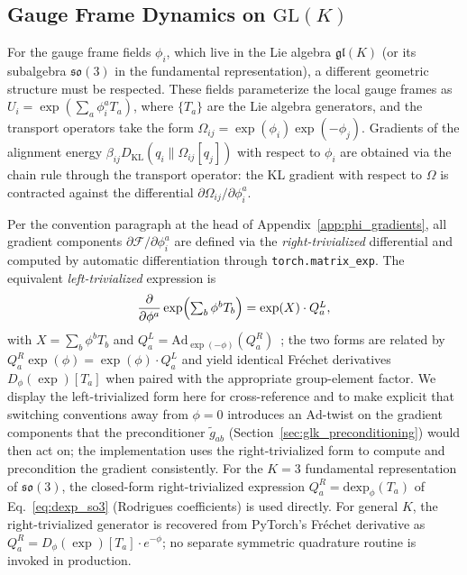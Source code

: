 \documentclass[twoside,11pt]{article}
\begin{document}
\subsection{Gauge Frame Dynamics on $\mathrm{GL}(K)$}
For the gauge frame fields $\phi_i$, which live in the Lie algebra $\mathfrak{gl}(K)$ (or its subalgebra $\mathfrak{so}(3)$ in the fundamental representation), a different geometric structure must be respected. These fields parameterize the local gauge frames as $U_i = \exp(\sum_a \phi_i^a T_a)$, where $\{T_a\}$ are the Lie algebra generators, and the transport operators take the form $\Omega_{ij} = \exp(\phi_i)\exp(-\phi_j)$. Gradients of the alignment energy $\beta_{ij} D_{\mathrm{KL}}(q_i \| \Omega_{ij}[q_j])$ with respect to $\phi_i$ are obtained via the chain rule through the transport operator: the KL gradient with respect to $\Omega$ is contracted against the differential $\partial\Omega_{ij}/\partial\phi_i^a$.

Per the convention paragraph at the head of Appendix~\ref{app:phi_gradients}, all gradient components $\partial \mathcal{F}/\partial \phi_i^a$ are defined via the \emph{right-trivialized} differential and computed by automatic differentiation through \texttt{torch.matrix\_exp}. The equivalent \emph{left-trivialized} expression is
\begin{equation}
\frac{\partial}{\partial \phi^a}\exp \Bigl(\textstyle\sum_b \phi^b T_b\Bigr) = \exp(X)\cdot Q_a^{L},
\end{equation}
with $X = \sum_b \phi^b T_b$ and $Q_a^{L} = \mathrm{Ad}_{\exp(-\phi)}(Q_a^{R})$~\citep{Hall2015}; the two forms are related by $Q_a^{R} \exp(\phi) = \exp(\phi) \cdot Q_a^{L}$ and yield identical Fr\'echet derivatives $D_\phi(\exp)[T_a]$ when paired with the appropriate group-element factor. We display the left-trivialized form here for cross-reference and to make explicit that switching conventions away from $\phi=0$ introduces an $\mathrm{Ad}$-twist on the gradient components that the preconditioner $\tilde g_{ab}$ (Section~\ref{sec:glk_preconditioning}) would then act on; the implementation uses the right-trivialized form to compute and precondition the gradient consistently. For the $K = 3$ fundamental representation of $\mathfrak{so}(3)$, the closed-form right-trivialized expression $Q_a^{R} = \mathrm{dexp}_\phi(T_a)$ of Eq.~\eqref{eq:dexp_so3} (Rodrigues coefficients) is used directly. For general $K$, the right-trivialized generator is recovered from PyTorch's Fr\'echet derivative as $Q_a^{R} = D_\phi(\exp)[T_a]\cdot e^{-\phi}$; no separate symmetric quadrature routine is invoked in production.
\end{document}
